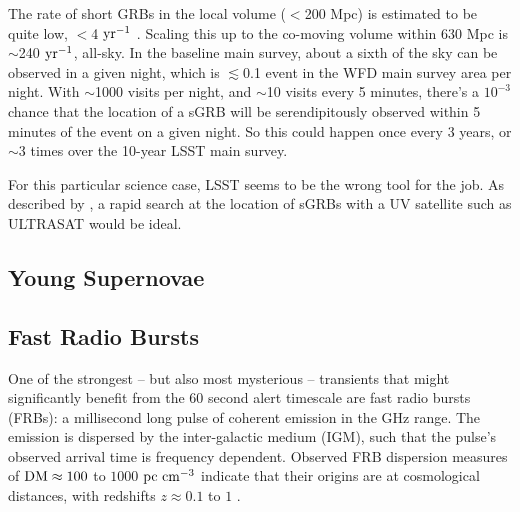 \documentclass[DM,lsstdraft,authoryear,toc]{lsstdoc}
\begin{document}

The rate of short GRBs in the local volume ($<$200 Mpc) is estimated to be quite low, $<$4 $\rm yr^{-1}$ \citep{2019arXiv190800100M}. Scaling this up to the co-moving volume within 630 Mpc is $\sim$240 $\rm yr^{-1}$, all-sky. In the baseline main survey, about a sixth of the sky can be observed in a given night, which is $\lesssim$0.1 event in the WFD main survey area per night. With $\sim$1000 visits per night, and $\sim$10 visits every 5 minutes, there's a $10^{-3}$ chance that the location of a sGRB will be serendipitously observed within 5 minutes of the event on a given night. So this could happen once every 3 years, or $\sim$3 times over the 10-year LSST main survey.

For this particular science case, LSST seems to be the wrong tool for the job. As described by \citet{2018MNRAS.473..576G}, a rapid search at the location of sGRBs with a UV satellite such as ULTRASAT would be ideal.



\subsection{Young Supernovae}\label{ssec:latency_ysne}


\subsection{Fast Radio Bursts}\label{ssec:latency_frb}

One of the strongest -- but also most mysterious -- transients that might significantly benefit from the $60$ second alert timescale are fast radio bursts (FRBs): a millisecond long pulse of coherent emission in the GHz range.
The emission is dispersed by the inter-galactic medium (IGM), such that the pulse's observed arrival time is frequency dependent.
Observed FRB dispersion measures of $\rm{DM}\approx100$ to $1000$ $\rm pc\ cm^{-3}$ indicate that their origins are at cosmological distances, with redshifts $z\approx0.1$ to $1$ \citep{2018Natur.562..386S}. 
\end{document}
